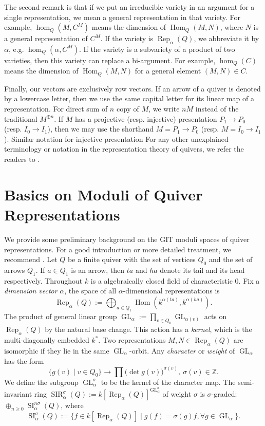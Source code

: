 \documentclass{amsart}
\theoremstyle{definition}
\theoremstyle{remark}
\numberwithin{equation}{section}
\begin{document}
The second remark is that if we put an irreducible variety in an argument for a single representation, we mean a general representation in that variety. For example, $\hom_Q(M,C^M)$ means the dimension of ${\operatorname{Hom}}_Q(M,N)$, where $N$ is a general representation of $C^M$. If the variety is ${\operatorname{Rep}}_\alpha(Q)$, we abbreviate it by $\alpha$, e.g. $\hom_Q(\alpha,C^M)$. If the variety is a subvariety of a product of two varieties, then this variety can replace a bi-argument. For example, $\hom_Q(C)$ means the dimension of ${\operatorname{Hom}}_Q(M,N)$ for a general element $(M,N)\in C$.

Finally, our vectors are exclusively row vectors. If an arrow of a quiver is denoted by a lowercase letter, then we use the same capital letter for its linear map of a representation. For direct sum of $n$ copy of $M$, we write $nM$ instead of the traditional $M^{\oplus n}$. If $M$ has a projective (resp. injective) presentation $P_1\to P_0$ (resp. $I_0\to I_1$), then we may use the shorthand $M=P_1\to P_0$ (resp. $M=I_0\to I_1$). Similar notation for injective presentation For any other unexplained terminology or notation in the representation theory of quivers, we refer the readers to \cite{DW2}.

\section{Basics on Moduli of Quiver Representations} \label{S:GIT}
We provide some preliminary background on the GIT moduli spaces of quiver representations. For a good introduction or more detailed treatment, we recommend \cite{Ki,R}.
Let $Q$ be a finite quiver with the set of vertices $Q_0$ and the set of arrows $Q_1$. If $a\in Q_1$ is an arrow, then $ta$ and $ha$ denote its tail and its head respectively. Throughout $k$ is a algebraically closed field of characteristic $0$. Fix a {\em dimension vector} $\alpha$, the space of all $\alpha$-dimensional representations is
$${\operatorname{Rep}}_\alpha(Q):=\bigoplus_{a\in Q_1}{\operatorname{Hom}}(k^{\alpha(ta)},k^{\alpha(ha)}).$$
The product of general linear group ${\operatorname{GL}}_\alpha:=\prod_{v\in Q_0}{\operatorname{GL}}_{\alpha(v)}$ acts on ${\operatorname{Rep}}_\alpha(Q)$ by the natural base change. This action has a {\em kernel}, which is the multi-diagonally embedded $k^*$. Two representations $M,N\in{\operatorname{Rep}}_\alpha(Q)$ are isomorphic if they lie in the same ${\operatorname{GL}}_\alpha$-orbit. Any {\em character} or {\em weight} of ${\operatorname{GL}}_\alpha$ has the form
$$\{g(v)\mid v\in Q_0\}\to\prod\big(\det g(v)\big)^{\sigma(v)},\ \sigma(v)\in{\mathbb{{Z}}}.$$
We define the subgroup ${\operatorname{GL}}_\alpha^\sigma$ to be the kernel of the character map. The semi-invariant ring ${\operatorname{SIR}}_\alpha^\sigma(Q):=k[{\operatorname{Rep}}_\alpha(Q)]^{{\operatorname{GL}}_\alpha^\sigma}$ of weight $\sigma$
is $\sigma$-graded: $\oplus_{n\geqslant 0} {\operatorname{SI}}_\alpha^{n\sigma}(Q)$, where
$${\operatorname{SI}}_\alpha^{\sigma}(Q):=\{f\in k[{\operatorname{Rep}}_\alpha(Q)]\mid g(f)=\sigma(g)f, \forall g\in{\operatorname{GL}}_\alpha\}.$$
\end{document}
